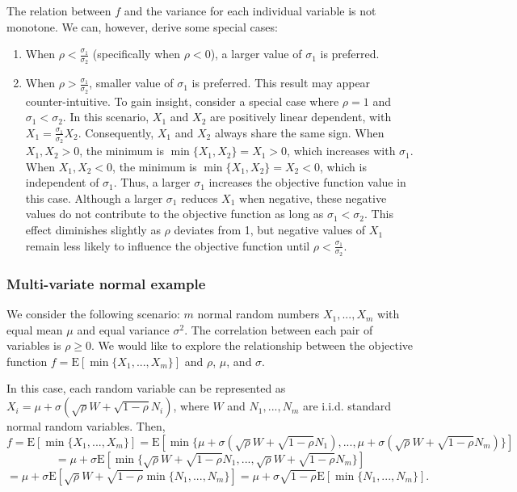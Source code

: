 \documentclass[opre,sglanonrev]{informs4}
\begin{document}
The relation between $f$ and the variance for each individual variable is not monotone. We can, however, derive some special cases:
	\begin{enumerate}
		\item When $\rho<\frac{\sigma_1}{\sigma_2}$ (specifically when $\rho<0$), a larger value of $\sigma_1$ is preferred.
		\item When $\rho>\frac{\sigma_1}{\sigma_2}$, smaller value of $\sigma_1$ is preferred. This result may appear counter-intuitive. To gain insight, consider a special case where $\rho = 1$ and $\sigma_1<\sigma_2$. In this scenario, $X_1$ and $X_2$ are positively linear dependent, with $ X_1 = \frac{\sigma_1}{\sigma_2} X_2$. Consequently, $X_1$ and $X_2$ always share the same sign. When $X_1, X_2 > 0$, the minimum is $\min\{X_1, X_2\} = X_1 > 0$, which increases with $\sigma_1$. When $X_1, X_2 < 0$, the minimum is $\min\{X_1, X_2\} = X_2 < 0$, which is independent of $\sigma_1$. Thus, a larger $\sigma_1$ increases the objective function value in this case. Although a larger $\sigma_1$ reduces $X_1$ when negative, these negative values do not contribute to the objective function as long as $\sigma_1 < \sigma_2$. This effect diminishes slightly as $\rho$ deviates from 1, but negative values of $X_1$ remain less likely to influence the objective function until $\rho < \frac{\sigma_1}{\sigma_2}$.
	\end{enumerate}


\subsubsection{Multi-variate normal example}
\label{multi-variate}

We consider the following scenario: $m$ normal random numbers $X_1,...,X_m$ with equal mean $\mu$ and equal variance $\sigma^2$. The correlation between each pair of variables is $\rho\geq 0$. We would like to explore the relationship between the objective function  $f = \text{E}[\min\{X_1,...,X_m\}]$ and $\rho$, $\mu$, and $\sigma$.

In this case, each random variable can be represented as $X_i = \mu + \sigma(\sqrt{\rho}W + \sqrt{1-\rho} N_i )$, where $W$ and $N_1,...,N_m$ are i.i.d. standard normal random variables. Then,
$$f = \text{E}[\min\{X_1,...,X_m\}] =  \text{E}[\min\{\mu + \sigma(\sqrt{\rho}W + \sqrt{1-\rho} N_1 ),...,\mu + \sigma(\sqrt{\rho}W + \sqrt{1-\rho} N_m )\}] $$
$$=\mu+ \sigma\text{E}[\min\{\sqrt{\rho}W + \sqrt{1-\rho} N_1 ,...,\sqrt{\rho}W + \sqrt{1-\rho} N_m \}]  $$
$$=\mu + \sigma\text{E}[\sqrt{\rho}W+ \sqrt{1-\rho} \min\{N_1,...,N_m\} ] =\mu + \sigma\sqrt{1-\rho} \text{E}[\min\{N_1,...,N_m\} ]. $$
\end{document}
